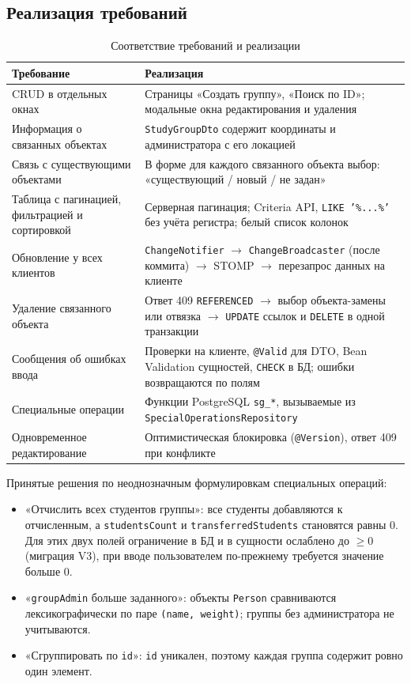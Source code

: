 \documentclass[a4paper,12pt]{article}
\begin{document}
\subsection{Реализация требований}

\begin{table}[H]
\centering
\small
\begin{tabularx}{\textwidth}{>{\raggedright\arraybackslash}p{} >{\raggedright\arraybackslash}X}
\toprule
\textbf{Требование} & \textbf{Реализация} \\
\midrule
CRUD в отдельных окнах & Страницы «Создать группу», «Поиск по ID»; модальные окна редактирования и удаления \\
Информация о связанных объектах & \texttt{StudyGroupDto} содержит координаты и администратора с его локацией \\
Связь с существующими объектами & В форме для каждого связанного объекта выбор: «существующий / новый / не задан» \\
Таблица с пагинацией, фильтрацией и сортировкой & Серверная пагинация; Criteria API, \texttt{LIKE '\%...\%'} без учёта регистра; белый список колонок \\
Обновление у всех клиентов & \texttt{ChangeNotifier} $\to$ \texttt{ChangeBroadcaster} (после коммита) $\to$ STOMP $\to$ перезапрос данных на клиенте \\
Удаление связанного объекта & Ответ 409 \texttt{REFERENCED} $\to$ выбор объекта-замены или отвязка $\to$ \texttt{UPDATE} ссылок и \texttt{DELETE} в одной транзакции \\
Сообщения об ошибках ввода & Проверки на клиенте, \texttt{@Valid} для DTO, Bean Validation сущностей, \texttt{CHECK} в БД; ошибки возвращаются по полям \\
Специальные операции & Функции PostgreSQL \texttt{sg\_*}, вызываемые из \texttt{SpecialOperationsRepository} \\
Одновременное редактирование & Оптимистическая блокировка (\texttt{@Version}), ответ 409 при конфликте \\
\bottomrule
\end{tabularx}
\caption{Соответствие требований и реализации}
\end{table}

Принятые решения по неоднозначным формулировкам специальных операций:
\begin{itemize}
  \item «Отчислить всех студентов группы»: все студенты добавляются к отчисленным, а \texttt{studentsCount} и \texttt{transferredStudents} становятся равны 0. Для этих двух полей ограничение в БД и в сущности ослаблено до $\geq 0$ (миграция V3), при вводе пользователем по-прежнему требуется значение больше 0.
  \item «\texttt{groupAdmin} больше заданного»: объекты \texttt{Person} сравниваются лексикографически по паре \texttt{(name, weight)}; группы без администратора не учитываются.
  \item «Сгруппировать по \texttt{id}»: \texttt{id} уникален, поэтому каждая группа содержит ровно один элемент.
\end{itemize}
\end{document}
